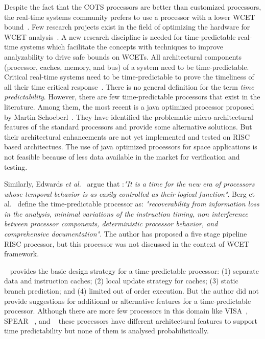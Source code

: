 Despite the fact that the COTS processors are better than customized processors, the real-time systems community prefers to use a processor with a lower WCET bound~\cite{bate2001use}. Few research projects exist in the field of optimizing the hardware for WCET analysis~\cite {thiele2004design}. A  new research discipline is needed for time-predictable real-time systems which facilitate the concepts with techniques to improve analyzability to drive safe bounds on WCETs.
All architectural components (processor, caches, memory, and bus) of a system need to be time-predictable.
Critical real-time systems need to be time-predictable to prove the timeliness of all their time critical response~\cite{kirner2010time}. There is no general definition for the term \textit{time predictability}. However, there are few time-predictable processors that exist in the literature. Among them, the most recent is a java optimized processor proposed by Martin Schoeberl~\cite{schoeberl2009time}. They have identified the problematic micro-architectural features of the standard processors and provide some alternative solutions. But their architectural enhancements are not yet implemented and tested on RISC based architectues. The use of java optimized processors for space applications is not feasible because of less data available in the market for verification and testing.

Similarly, Edwards \emph{et al.}~\cite{edwards2007case} argue that :\textit{"It is a time for the new era of processors whose temporal behavior is as easily controlled as their logical function"}. Berg et al.~\cite {berg2004requirements} define the time-predictable processor as: \textit{"recoverability from information loss in the analysis, minimal variations of the instruction timing, non interference between processor components, deterministic processor behavior, and comprehensive documentation"}. The author has proposed a five stage pipeline RISC processor, but this processor was not discussed in the context of WCET framework. 

~\cite{heckmann2003influence} provides the basic design strategy for a time-predictable processor: (1) separate data and instruction caches; (2) local update strategy for caches; (3) static branch prediction; and (4) limited out of order execution. But the author did not provide suggestions for additional or alternative features for a time-predictable processor. Although there are more few processors in this domain like VISA~\cite{anantaraman2003virtual}, SPEAR ~\cite{delvai2003processor}, and ~\cite{whitham2008real} these processors have different architectural features to support time predictability but none of them is analysed probabilistically.

